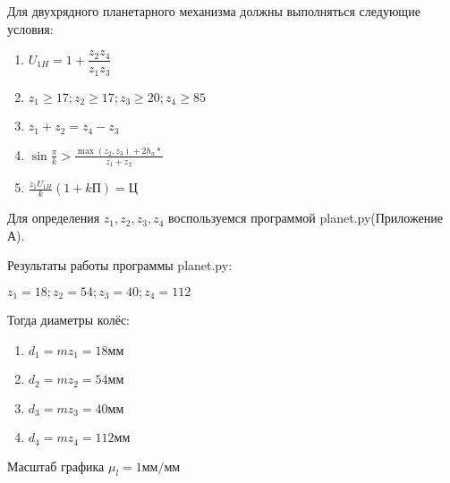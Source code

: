 Для двухрядного планетарного механизма должны выполняться следующие условия:

\begin{enumerate}
	\item $ U_{1H} = 1 + \dfrac{z_2 z_4}{z_1 z_3}$
	\item $z_1 \geqslant 17; z_2 \geqslant 17; z_3 \geqslant 20; z_4 \geqslant 85$
	\item $z_1 + z_2 = z_4 - z_3$
	\item $\sin{\frac{\pi}{k}} > \frac{\max(z_2, z_3) + 2 h_a*}{z_1 + z_2}$
	\item $ \frac{z_1 U_{1H}}{k}(1 + kП) = Ц$
\end{enumerate}

Для определения $z_1, z_2, z_3, z_4$ воспользуемся программой planet.py(Приложение А).

Результаты работы программы planet.py:

$z_1 = 18; z_2 = 54; z_3 = 40; z_4 = 112$

Тогда диаметры колёс:

\begin{enumerate}
	\item $d_1 = mz_1 = 18 мм$
	\item $d_2 = mz_2 = 54 мм$
	\item $ d_3 = mz_3 = 40 мм $
	\item $ d_4 = mz_4 = 112 мм $
\end{enumerate}

Масштаб графика $\mu_l = 1 мм/мм$